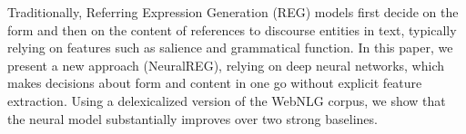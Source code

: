 Traditionally, Referring Expression Generation (REG) models first decide on the form and then on the content of references to discourse entities in text, typically relying on features such as salience and grammatical function. In this paper, we present a new approach (NeuralREG), relying on deep neural networks, which makes decisions about form and content in one go without explicit feature extraction. Using a delexicalized version of the WebNLG corpus, we show that the neural model substantially improves over two strong baselines.
